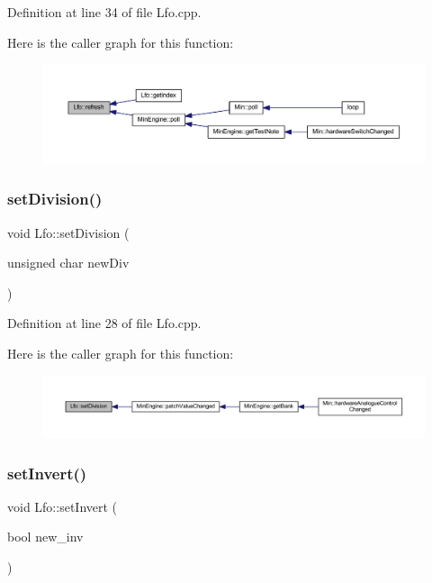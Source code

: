Definition at line 34 of file Lfo.\+cpp.

Here is the caller graph for this function\+:
\nopagebreak
\begin{figure}[H]
\begin{center}
\leavevmode
\includegraphics[width=350pt]{class_lfo_a42c8d118df4ecbf3057319b56203133d_icgraph}
\end{center}
\end{figure}
\mbox{\label{class_lfo_a525733f0ed750902b8577b08c0c55023}} 
\subsubsection{\texorpdfstring{set\+Division()}{setDivision()}}
{\footnotesize\ttfamily void Lfo\+::set\+Division (\begin{DoxyParamCaption}\item[{unsigned char}]{new\+Div }\end{DoxyParamCaption})}



Definition at line 28 of file Lfo.\+cpp.

Here is the caller graph for this function\+:
\nopagebreak
\begin{figure}[H]
\begin{center}
\leavevmode
\includegraphics[width=350pt]{class_lfo_a525733f0ed750902b8577b08c0c55023_icgraph}
\end{center}
\end{figure}
\mbox{\label{class_lfo_ae4f5f170252aabf8d6e44556e587779e}} 
\subsubsection{\texorpdfstring{set\+Invert()}{setInvert()}}
{\footnotesize\ttfamily void Lfo\+::set\+Invert (\begin{DoxyParamCaption}\item[{bool}]{new\+\_\+inv }\end{DoxyParamCaption})\hspace{0.3cm}{\ttfamily [inline]}}




